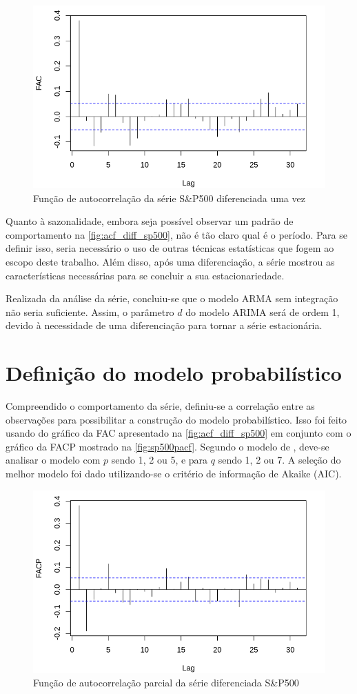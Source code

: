 \documentclass[
    12pt,
    oneside,
    a4paper,
    english,
    brazil
]{abntex2}
\begin{document}
\begin{figure}[ht]
    \centering
    \caption{Função de autocorrelação da série S\&P500 diferenciada uma vez}\label{fig:acf_diff_sp500}
    \includegraphics[width=.5\linewidth]{images/SP500_diff_FAC.png}
\end{figure}

Quanto à sazonalidade, embora seja possível observar um padrão de comportamento na  \autoref{fig:acf_diff_sp500}, não é tão claro qual é o período. Para se definir isso, seria necessário o uso de outras técnicas estatísticas que fogem ao escopo deste trabalho. Além disso, após uma diferenciação, a série mostrou as características necessárias para se concluir a sua estacionariedade.

Realizada da análise da série, concluiu-se que  o modelo  ARMA sem  integração não seria  suficiente.  Assim, o  parâmetro  $d$  do  modelo  ARIMA será  de  ordem
1,  devido  à necessidade de uma  diferenciação  para  tornar  a  série
estacionária.

\section{Definição do modelo probabilístico}

Compreendido  o  comportamento  da  série, definiu-se  a  correlação  entre  as
observações  para  possibilitar a  construção  do  modelo probabilístico.  Isso
foi  feito   usando  do  gráfico   da  FAC  apresentado
na  \autoref{fig:acf_diff_sp500}  em  conjunto  com  o  gráfico  da  FACP mostrado na  \autoref{fig:sp500pacf}.  Segundo  o   modelo  de
, deve-se analisar o modelo com $p$ sendo 1, 2 ou 5, e para $q$
sendo 1, 2 ou  7. A seleção do melhor modelo foi dado  utilizando-se o critério de
informação de Akaike (AIC).

\begin{figure}[ht]
    \centering
    \caption{Função de autocorrelação parcial da série diferenciada S\&P500}\label{fig:sp500pacf}
    \includegraphics[width=.5\linewidth]{images/SP500_diff_FACP.png}
\end{figure}
\end{document}
